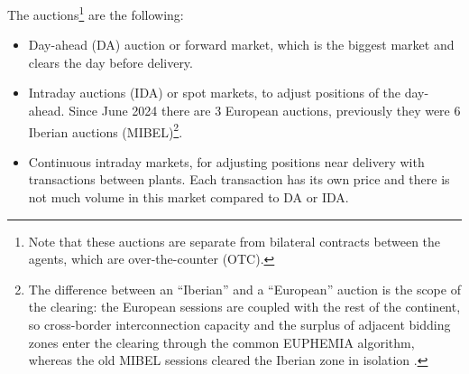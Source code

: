 \documentclass[11pt,a4paper]{article}
\theoremstyle{definition}
\theoremstyle{remark}
\theoremstyle{plain}
\begin{document}
The auctions\footnote{Note that these auctions are separate from bilateral contracts between the agents, which are over-the-counter (OTC).} are the following: 
  \begin{itemize}
    \item Day-ahead (DA) auction or forward market, which is the biggest market and clears the day before delivery.
    \item Intraday auctions (IDA) or spot markets, to adjust positions of the day-ahead. Since June 2024 there are 3 European auctions, previously they were 6 Iberian auctions (MIBEL)\footnote{The difference between an ``Iberian'' and a ``European'' auction is the scope of the clearing: the European sessions are coupled with the rest of the continent, so cross-border interconnection capacity and the surplus of adjacent bidding zones enter the clearing through the common EUPHEMIA algorithm, whereas the old MIBEL sessions cleared the Iberian zone in isolation \citep{euphemia_2025}.}.
    \item Continuous intraday markets, for adjusting positions near delivery with transactions between plants. Each transaction has its own price and there is not much volume in this market compared to DA or IDA.
  \end{itemize}
\end{document}
